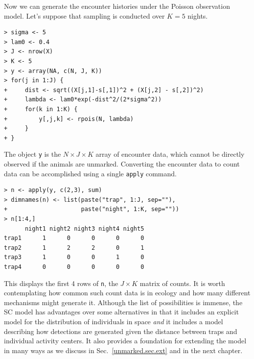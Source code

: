 Now we can generate the encounter histories under the
Poisson observation model. Let's suppose that sampling is conducted
over $K=5$ nights.
\begin{small}
\begin{verbatim}
> sigma <- 5
> lam0 <- 0.4
> J <- nrow(X)
> K <- 5
> y <- array(NA, c(N, J, K))
> for(j in 1:J) {
+     dist <- sqrt((X[j,1]-s[,1])^2 + (X[j,2] - s[,2])^2)
+     lambda <- lam0*exp(-dist^2/(2*sigma^2))
+     for(k in 1:K) {
+         y[,j,k] <- rpois(N, lambda)
+     }
+ }
\end{verbatim}
\end{small}
The object \verb+y+ is the $N \times J \times K$ array of encounter
data, which cannot be directly observed if the animals are unmarked.
Converting the encounter data to count data can be accomplished using a single
\verb+apply+ command.
\begin{small}
\begin{verbatim}
> n <- apply(y, c(2,3), sum)
> dimnames(n) <- list(paste("trap", 1:J, sep=""),
+                     paste("night", 1:K, sep=""))
> n[1:4,]
      night1 night2 night3 night4 night5
trap1      1      0      0      0      0
trap2      1      2      2      0      1
trap3      1      0      0      1      0
trap4      0      0      0      0      0
\end{verbatim}
\end{small}
This displays the first 4 rows of \verb+n+, the $J \times K$
matrix of counts. 
It is worth contemplating how common such count data
is in
ecology and how many different mechanisms might generate it. Although
the list of possibilities is immense, the SC model has advantages over
some alternatives
in that it includes an explicit
model for the distribution of individuals in space \textit{and} it
includes a model describing how detections are generated given the
distance between traps and individual activity centers. It also
provides a foundation for extending the model in many ways as we
discuss in Sec.~\ref{unmarked.sec.ext} and in the next chapter.

